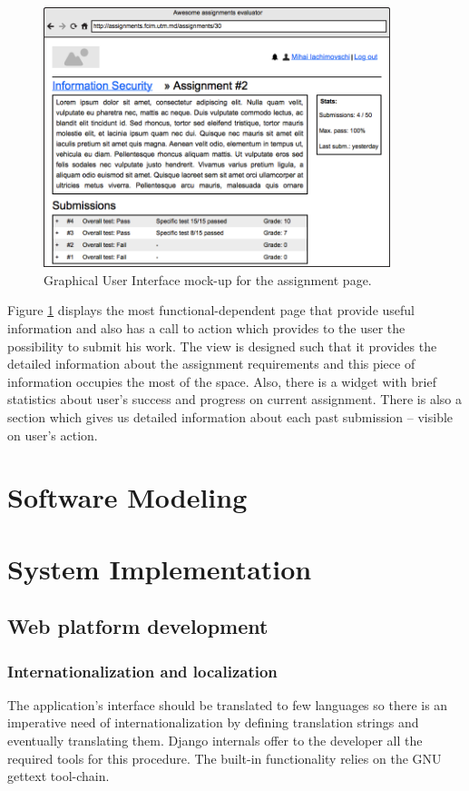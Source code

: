 \documentclass[12pt,oneside,a4paper]{article}
\begin{document}
\begin{figure}[!ht]
  \centering
    \includegraphics[width=0.9\textwidth]{pic/wireframe-assignment.png}
    \caption{Graphical User Interface mock-up for the assignment page.}
    \label{fig:mock_up_assignment}
\end{figure}

Figure \ref{fig:mock_up_assignment} displays the most functional-dependent page that provide useful information and also has a call to action which provides to the user the possibility to submit his work. The view is designed such that it provides the detailed information about the assignment requirements and this piece of information occupies the most of the space. Also, there is a widget with brief statistics about user's success and progress on current assignment. There is also a section which gives us detailed information about each past submission -- visible on user's action.

\newpage
\section{Software Modeling}

\newpage
\section{System Implementation}
\subsection{Web platform development}
\subsubsection{Internationalization and localization}
The application's interface should be translated to few languages so there is an imperative need of internationalization by defining translation strings and eventually translating them. Django internals offer to the developer all the required tools for this procedure. The built-in functionality relies on the GNU gettext tool-chain.
\end{document}
